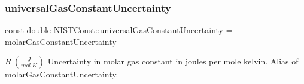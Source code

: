 \subsubsection{\texorpdfstring{universal\+Gas\+Constant\+Uncertainty}{universalGasConstantUncertainty}}
{\footnotesize\ttfamily const double N\+I\+S\+T\+Const\+::universal\+Gas\+Constant\+Uncertainty = molar\+Gas\+Constant\+Uncertainty}

$R \ (\frac{J}{mol\ K})$ Uncertainty in molar gas constant in joules per mole kelvin. Alias of molar\+Gas\+Constant\+Uncertainty. 